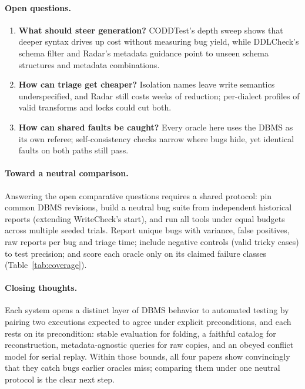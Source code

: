 \paragraph{Open questions.}
\begin{enumerate}[leftmargin=1.3em,itemsep=1pt,topsep=2pt]
\item \textbf{What should steer generation?} CODDTest's depth sweep shows that deeper syntax drives up cost without measuring bug yield, while DDLCheck's schema filter and Radar's metadata guidance point to unseen schema structures and metadata combinations.
\item \textbf{How can triage get cheaper?} Isolation names leave write semantics underspecified, and Radar still costs weeks of reduction; per-dialect profiles of valid transforms and locks could cut both.
\item \textbf{How can shared faults be caught?} Every oracle here uses the DBMS as its own referee; self-consistency checks narrow where bugs hide, yet identical faults on both paths still pass.
\end{enumerate}

\paragraph{Toward a neutral comparison.} Answering the open comparative questions requires a shared protocol: pin common DBMS revisions, build a neutral bug suite from independent historical reports (extending WriteCheck's start), and run all tools under equal budgets across multiple seeded trials. Report unique bugs with variance, false positives, raw reports per bug and triage time; include negative controls (valid tricky cases) to test precision; and score each oracle only on its claimed failure classes (Table~\ref{tab:coverage}).

\paragraph{Closing thoughts.} Each system opens a distinct layer of DBMS behavior to automated testing by pairing two executions expected to agree under explicit preconditions, and each rests on its precondition: stable evaluation for folding, a faithful catalog for reconstruction, metadata-agnostic queries for raw copies, and an obeyed conflict model for serial replay. Within those bounds, all four papers show convincingly that they catch bugs earlier oracles miss; comparing them under one neutral protocol is the clear next step.

